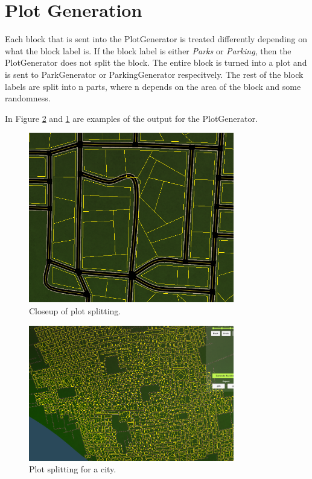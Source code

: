 \section{Plot Generation}
Each block that is sent into the PlotGenerator is treated differently depending on what the block label is. 
If the block label is either \textit{Parks} or \textit{Parking}, then the PlotGenerator does not split the block. 
The entire block is turned into a plot and is sent to ParkGenerator or ParkingGenerator respecitvely.
The rest of the block labels are split into n parts, where n depends on the area of the block and some randomness. 

In Figure \ref{fig:plot} and \ref{fig:plot2} are examples of the output for the PlotGenerator.

\begin{figure}[H]
  \centering

  \includegraphics[width=0.8\textwidth]{figure/plot2.png}
  \caption{Closeup of plot splitting.}

  \label{fig:plot2}
\end{figure}

\begin{figure}[H]
  \centering

  \includegraphics[width=0.8\textwidth]{figure/plot.png}
  \caption{Plot splitting for a city.}

  \label{fig:plot}
\end{figure}

